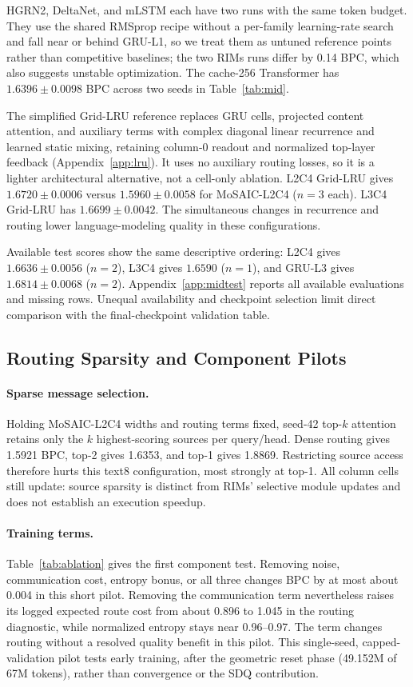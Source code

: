 \documentclass[letterpaper,twoside]{article}
\begin{document}
HGRN2, DeltaNet, and mLSTM each have two runs with the same token budget. They use the shared RMSprop recipe without a per-family learning-rate search and fall near or behind GRU-L1, so we treat them as untuned reference points rather than competitive baselines; the two RIMs runs differ by 0.14 BPC, which also suggests unstable optimization. The cache-256 Transformer has $1.6396\pm0.0098$ BPC across two seeds in Table~\ref{tab:mid}.

The simplified Grid-LRU reference replaces GRU cells, projected content attention, and auxiliary terms with complex diagonal linear recurrence and learned static mixing, retaining column-0 readout and normalized top-layer feedback (Appendix~\ref{app:lru}). It uses no auxiliary routing losses, so it is a lighter architectural alternative, not a cell-only ablation. L2C4 Grid-LRU gives $1.6720\pm0.0006$ versus $1.5960\pm0.0058$ for MoSAIC-L2C4 ($n=3$ each). L3C4 Grid-LRU has $1.6699\pm0.0042$. The simultaneous changes in recurrence and routing lower language-modeling quality in these configurations.

Available test scores show the same descriptive ordering: L2C4 gives $1.6636\pm0.0056$ ($n=2$), L3C4 gives $1.6590$ ($n=1$), and GRU-L3 gives $1.6814\pm0.0068$ ($n=2$). Appendix~\ref{app:midtest} reports all available evaluations and missing rows. Unequal availability and checkpoint selection limit direct comparison with the final-checkpoint validation table.

\subsection{Routing Sparsity and Component Pilots}\label{sec:ablation}

\paragraph{Sparse message selection.}
Holding MoSAIC-L2C4 widths and routing terms fixed, seed-42 top-$k$ attention retains only the $k$ highest-scoring sources per query/head. Dense routing gives 1.5921 BPC, top-2 gives 1.6353, and top-1 gives 1.8869. Restricting source access therefore hurts this text8 configuration, most strongly at top-1. All column cells still update: source sparsity is distinct from RIMs' selective module updates and does not establish an execution speedup.



\paragraph{Training terms.}
Table~\ref{tab:ablation} gives the first component test. Removing noise, communication cost, entropy bonus, or all three changes BPC by at most about 0.004 in this short pilot. Removing the communication term nevertheless raises its logged expected route cost from about 0.896 to 1.045 in the routing diagnostic, while normalized entropy stays near 0.96--0.97. The term changes routing without a resolved quality benefit in this pilot. This single-seed, capped-validation pilot tests early training, after the geometric reset phase (49.152M of 67M tokens), rather than convergence or the SDQ contribution.
\end{document}
